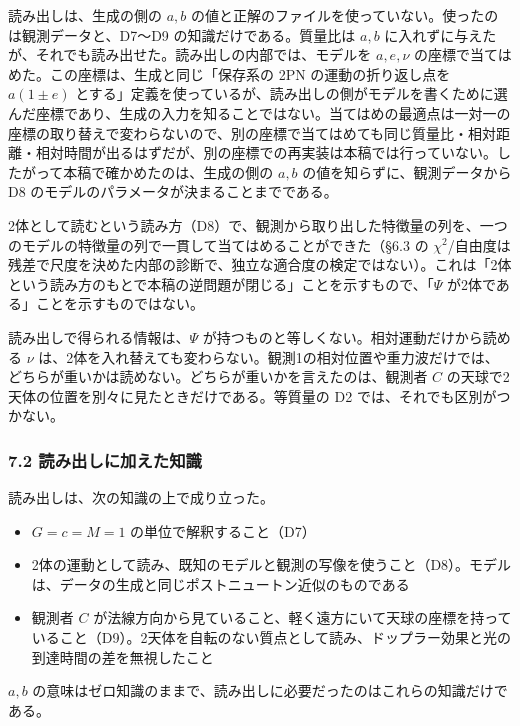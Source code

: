 \documentclass[
  a4paper,
]{ltjsarticle}
\providecommand{\tightlist}{%
  \setlength{\itemsep}{0pt}\setlength{\parskip}{0pt}}
\begin{document}
読み出しは、生成の側の \(a, b\)
の値と正解のファイルを使っていない。使ったのは観測データと、D7〜D9
の知識だけである。質量比は \(a, b\)
に入れずに与えたが、それでも読み出せた。読み出しの内部では、モデルを
\(a, e, \nu\) の座標で当てはめた。この座標は、生成と同じ「保存系の 2PN
の運動の折り返し点を \(a(1\pm e)\)
とする」定義を使っているが、読み出しの側がモデルを書くために選んだ座標であり、生成の入力を知ることではない。当てはめの最適点は一対一の座標の取り替えで変わらないので、別の座標で当てはめても同じ質量比・相対距離・相対時間が出るはずだが、別の座標での再実装は本稿では行っていない。したがって本稿で確かめたのは、生成の側の
\(a, b\) の値を知らずに、観測データから D8
のモデルのパラメータが決まることまでである。

2体として読むという読み方（D8）で、観測から取り出した特徴量の列を、一つのモデルの特徴量の列で一貫して当てはめることができた（§6.3
の
\(\chi^2\)/自由度は残差で尺度を決めた内部の診断で、独立な適合度の検定ではない）。これは「2体という読み方のもとで本稿の逆問題が閉じる」ことを示すもので、「\(\Psi\)
が2体である」ことを示すものではない。

読み出しで得られる情報は、\(\Psi\)
が持つものと等しくない。相対運動だけから読める \(\nu\)
は、2体を入れ替えても変わらない。観測1の相対位置や重力波だけでは、どちらが重いかは読めない。どちらが重いかを言えたのは、観測者
\(C\) の天球で2天体の位置を別々に見たときだけである。等質量の D2
では、それでも区別がつかない。

\subsubsection{7.2
読み出しに加えた知識}\label{ux8aadux307fux51faux3057ux306bux52a0ux3048ux305fux77e5ux8b58}

読み出しは、次の知識の上で成り立った。

\begin{itemize}
\tightlist
\item
  \(G=c=M=1\) の単位で解釈すること（D7）
\item
  2体の運動として読み、既知のモデルと観測の写像を使うこと（D8）。モデルは、データの生成と同じポストニュートン近似のものである
\item
  観測者 \(C\)
  が法線方向から見ていること、軽く遠方にいて天球の座標を持っていること（D9）。2天体を自転のない質点として読み、ドップラー効果と光の到達時間の差を無視したこと
\end{itemize}

\(a, b\)
の意味はゼロ知識のままで、読み出しに必要だったのはこれらの知識だけである。
\end{document}
